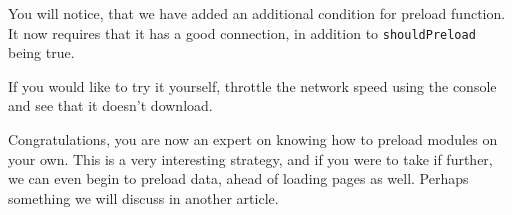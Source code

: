 You will notice, that we have added an additional condition for preload function. 
It now requires that it has a good connection, in addition to \lstinline{shouldPreload}
being true. 

If you would like to try it yourself, throttle the network speed using the console 
and see that it doesn't download. 

Congratulations, you are now an expert on knowing how to preload modules on your own. 
This is a very interesting strategy, and if you were to take if further, we can even 
begin to preload data, ahead of loading pages as well. Perhaps something we will 
discuss in another article. 